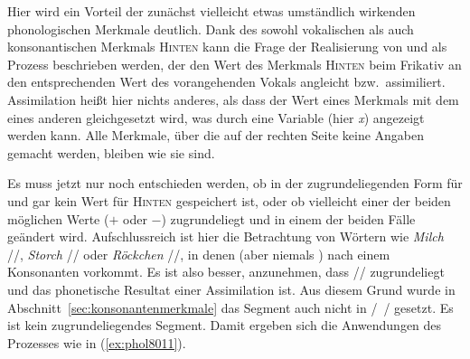 \begin{exe}
  \ex\label{ex:phol1190}
  \begin{xlist}
  \end{xlist}
\end{exe}

Hier wird ein Vorteil der zunächst vielleicht etwas umständlich wirkenden phonologischen Merkmale deutlich.
Dank des sowohl vokalischen als auch konsonantischen Merkmals \textsc{Hinten} kann die Frage der Realisierung von \textipa{[\c{c}]} und \textipa{[X]} als Prozess beschrieben werden, der den Wert des Merkmals \textsc{Hinten} beim Frikativ an den entsprechenden Wert des vorangehenden Vokals angleicht bzw.\ assimiliert.
Assimilation heißt hier nichts anderes, als dass der Wert eines Merkmals mit dem eines anderen gleichgesetzt wird, was durch eine Variable (hier \textit{x}) angezeigt werden kann.
Alle Merkmale, über die auf der rechten Seite keine Angaben gemacht werden, bleiben wie sie sind.


Es muss jetzt nur noch entschieden werden, ob in der zugrundeliegenden Form für \textipa{[\c{c}]} und \textipa{[X]} gar kein Wert für \textsc{Hinten} gespeichert ist, oder ob vielleicht einer der beiden möglichen Werte ($+$ oder $-$) zugrundeliegt und in einem der beiden Fälle geändert wird.
Aufschlussreich ist hier die Betrachtung von Wörtern wie \textit{Milch} //, \textit{Storch} // oder \textit{Röckchen} //, in denen \textipa{[\c{c}]} (aber niemals \textipa{[X]}) nach einem Konsonanten vorkommt.
Es ist also besser, anzunehmen, dass // zugrundeliegt und \textipa{[X]} das phonetische Resultat einer Assimilation ist.
Aus diesem Grund wurde in Abschnitt~\ref{sec:konsonantenmerkmale} das Segment \textipa{[X]} auch nicht in /~/ gesetzt.
Es ist kein zugrundeliegendes Segment.
Damit ergeben sich die Anwendungen des Prozesses wie in (\ref{ex:phol8011}).

